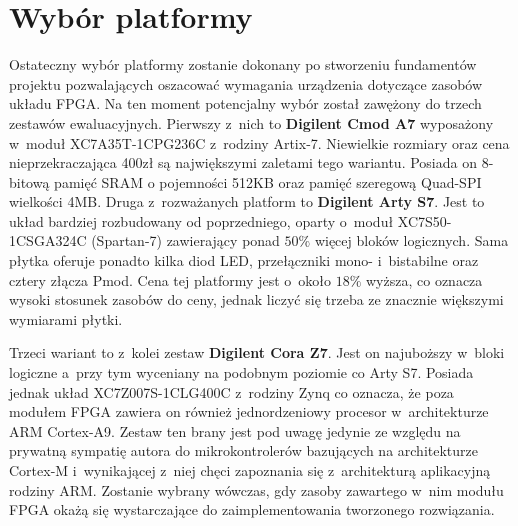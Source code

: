 
\section{Wybór platformy}

Ostateczny wybór platformy zostanie dokonany po stworzeniu fundamentów projektu pozwalających oszacować wymagania urządzenia dotyczące zasobów układu FPGA. Na ten moment potencjalny wybór został zawężony do trzech zestawów ewaluacyjnych. Pierwszy z~nich to \textbf{Digilent Cmod A7} wyposażony w~moduł XC7A35T-1CPG236C z~rodziny Artix-7. Niewielkie rozmiary oraz cena nieprzekraczająca 400zł są największymi zaletami tego wariantu. Posiada on 8-bitową pamięć SRAM o pojemności 512KB oraz pamięć szeregową Quad-SPI wielkości 4MB. Druga z~rozważanych platform to \textbf{Digilent Arty S7}. Jest to układ bardziej rozbudowany od poprzedniego, oparty o~moduł XC7S50-1CSGA324C (Spartan-7) zawierający ponad $50\%$ więcej bloków logicznych. Sama płytka oferuje ponadto kilka diod LED, przełączniki mono- i~bistabilne oraz cztery złącza Pmod. Cena tej platformy jest o~około $18\%$ wyższa, co oznacza wysoki stosunek zasobów do ceny, jednak liczyć się trzeba ze znacznie większymi wymiarami płytki.

Trzeci wariant to z~kolei zestaw \textbf{Digilent Cora Z7}. Jest on najuboższy w~bloki logiczne a~przy tym wyceniany na podobnym poziomie co Arty S7. Posiada jednak układ XC7Z007S-1CLG400C z~rodziny Zynq co oznacza, że poza modułem FPGA zawiera on również jednordzeniowy procesor w~architekturze ARM Cortex-A9. Zestaw ten brany jest pod uwagę jedynie ze względu na prywatną sympatię autora do mikrokontrolerów bazujących na architekturze Cortex-M i~wynikającej z~niej chęci zapoznania się z~architekturą aplikacyjną rodziny ARM. Zostanie wybrany wówczas, gdy zasoby zawartego w~nim modułu FPGA okażą się wystarczające do zaimplementowania tworzonego rozwiązania.
